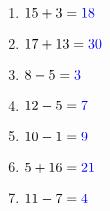 \documentclass[11pt]{article}\usepackage[a4paper,margin=0.90in,tmargin=0.5in]{geometry}\usepackage{amsmath, amsthm, amssymb}
\begin{document}
\begin{multicols}{4}
\begin{enumerate}[itemsep=0.45\baselineskip]
\item $15 + 3 = { \color[rgb]{0,0,1} 18 }$ 
\item $17 + 13 = { \color[rgb]{0,0,1} 30 }$ 
\item $8 - 5 = { \color[rgb]{0,0,1} 3 }$ 
\item $12 - 5 = { \color[rgb]{0,0,1} 7 }$ 
\item $10 - 1 = { \color[rgb]{0,0,1} 9 }$ 
\item $5 + 16 = { \color[rgb]{0,0,1} 21 }$ 
\item $11 - 7 = { \color[rgb]{0,0,1} 4 }$ 
\end{enumerate}
\end{multicols}
\end{document}
